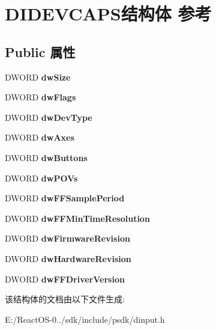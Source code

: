 \hypertarget{struct_d_i_d_e_v_c_a_p_s}{}\section{D\+I\+D\+E\+V\+C\+A\+P\+S结构体 参考}
\label{struct_d_i_d_e_v_c_a_p_s}
\subsection*{Public 属性}
\begin{DoxyCompactItemize}
\item 
\mbox{\label{struct_d_i_d_e_v_c_a_p_s_a7e9d9de15875754c37a3a63b6b4d91e3}} 
D\+W\+O\+RD {\bfseries dw\+Size}
\item 
\mbox{\label{struct_d_i_d_e_v_c_a_p_s_a907348155df993da724b0c9ed52b1ca3}} 
D\+W\+O\+RD {\bfseries dw\+Flags}
\item 
\mbox{\label{struct_d_i_d_e_v_c_a_p_s_af1009ed5cf45d2b7c18458de314444ee}} 
D\+W\+O\+RD {\bfseries dw\+Dev\+Type}
\item 
\mbox{\label{struct_d_i_d_e_v_c_a_p_s_a2784eed7d0fe11cd12da1735baacd067}} 
D\+W\+O\+RD {\bfseries dw\+Axes}
\item 
\mbox{\label{struct_d_i_d_e_v_c_a_p_s_a51eaf3f1838f52973a2bf4708d0b4354}} 
D\+W\+O\+RD {\bfseries dw\+Buttons}
\item 
\mbox{\label{struct_d_i_d_e_v_c_a_p_s_a749ea8eff5fbac84be6636db1301fe56}} 
D\+W\+O\+RD {\bfseries dw\+P\+O\+Vs}
\item 
\mbox{\label{struct_d_i_d_e_v_c_a_p_s_a3caab3a620e0b93b228dc3304ddb888a}} 
D\+W\+O\+RD {\bfseries dw\+F\+F\+Sample\+Period}
\item 
\mbox{\label{struct_d_i_d_e_v_c_a_p_s_af8cf75fc375eb15f21841bd624ea34dd}} 
D\+W\+O\+RD {\bfseries dw\+F\+F\+Min\+Time\+Resolution}
\item 
\mbox{\label{struct_d_i_d_e_v_c_a_p_s_ade3d390194cdc9034f11053b9db27558}} 
D\+W\+O\+RD {\bfseries dw\+Firmware\+Revision}
\item 
\mbox{\label{struct_d_i_d_e_v_c_a_p_s_a0d1c4a1d6132386b749c37bb8890fb57}} 
D\+W\+O\+RD {\bfseries dw\+Hardware\+Revision}
\item 
\mbox{\label{struct_d_i_d_e_v_c_a_p_s_ab38df626ae6c48697e37a6582f89492c}} 
D\+W\+O\+RD {\bfseries dw\+F\+F\+Driver\+Version}
\end{DoxyCompactItemize}


该结构体的文档由以下文件生成\+:\begin{DoxyCompactItemize}
\item 
E\+:/\+React\+O\+S-\/0../sdk/include/psdk/dinput.\+h\end{DoxyCompactItemize}
